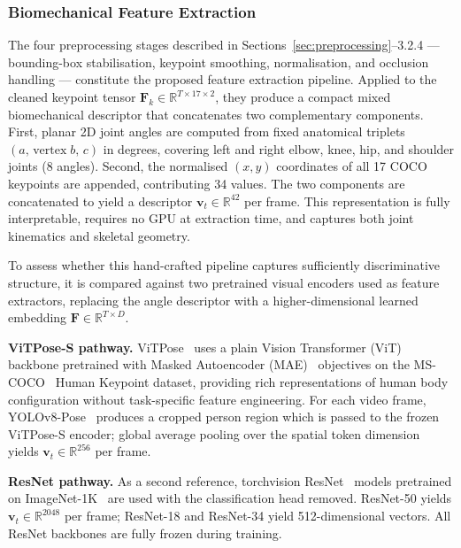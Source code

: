 \documentclass[conference,onecolumn,oneside]{IEEEtran}
\begin{document}
\subsubsection{Biomechanical Feature Extraction}
\vspace{0.5cm}
\label{sec:vitpose}
The four preprocessing stages described in Sections~\ref{sec:preprocessing}--3.2.4
— bounding-box stabilisation, keypoint smoothing, normalisation, and occlusion
handling — constitute the proposed feature extraction pipeline. Applied to the
cleaned keypoint tensor $\mathbf{F}_k \in \mathbb{R}^{T \times 17 \times 2}$,
they produce a compact mixed biomechanical descriptor that concatenates two
complementary components. First, planar 2D joint angles are computed from fixed
anatomical triplets $(a,\,\text{vertex}\;b,\,c)$ in degrees, covering left and
right elbow, knee, hip, and shoulder joints (8 angles). Second, the normalised
$(x, y)$ coordinates of all 17 COCO keypoints are appended, contributing 34
values. The two components are concatenated to yield a descriptor
$\mathbf{v}_t \in \mathbb{R}^{42}$ per frame. This representation is fully
interpretable, requires no GPU at extraction time, and captures both joint
kinematics and skeletal geometry.

To assess whether this hand-crafted pipeline captures sufficiently discriminative
structure, it is compared against two pretrained visual encoders used as feature
extractors, replacing the angle descriptor with a higher-dimensional learned
embedding $\mathbf{F} \in \mathbb{R}^{T \times D}$.

\textbf{ViTPose-S pathway.} ViTPose~\cite{21} uses a plain Vision Transformer (ViT)
backbone pretrained with Masked Autoencoder (MAE)~\cite{he2022mae} objectives on
the MS-COCO~\cite{lin2014coco} Human Keypoint dataset, providing rich representations
of human body configuration without task-specific feature engineering. For each video
frame, YOLOv8-Pose~\cite{20} produces a cropped person region which is passed to the
frozen ViTPose-S encoder; global average pooling over the spatial token dimension
yields $\mathbf{v}_t \in \mathbb{R}^{256}$ per frame.

\textbf{ResNet pathway.} As a second reference, torchvision ResNet~\cite{he2016resnet}
models pretrained on ImageNet-1K~\cite{russakovsky2015imagenet} are used with the
classification head removed. ResNet-50 yields $\mathbf{v}_t \in \mathbb{R}^{2048}$
per frame; ResNet-18 and ResNet-34 yield 512-dimensional vectors. All ResNet
backbones are fully frozen during training.
\end{document}

